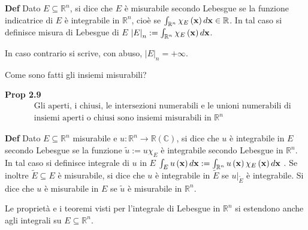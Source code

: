 \documentclass{article}
\begin{document}
\textbf{Def} Dato $E\subseteq 
\mathbb{R}
^{n}$, si dice che $E$ \`{e} misurabile secondo Lebesgue se la funzione
indicatrice di $E$ \`{e} integrabile in $%
\mathbb{R}
^{n}$, cio\`{e} se $\int_{%
\mathbb{R}
^{n}}\chi _{E}\left( \mathbf{x}\right) d\mathbf{x}\in 
\mathbb{R}
$. In tal caso si definisce misura di Lebesgue di $E$ $\left\vert
E\right\vert _{n}:=\int_{%
\mathbb{R}
^{n}}\chi _{E}\left( \mathbf{x}\right) d\mathbf{x}$.

In caso contrario si scrive, con abuso, $\left\vert E\right\vert
_{n}=+\infty $.

Come sono fatti gli insiemi misurabili?

\textbf{Prop 2.9 } 
\begin{eqnarray*}
&&\text{Gli aperti, i chiusi, le intersezioni numerabili e le unioni
numerabili di} \\
&&\text{insiemi aperti o chiusi sono insiemi misurabili in }%
\mathbb{R}
^{n}
\end{eqnarray*}

\textbf{Def} Dato $E\subseteq 
\mathbb{R}
^{n}$ misurabile e $u:%
\mathbb{R}
^{n}\rightarrow 
\mathbb{R}
\left( 
\mathbb{C}
\right) $, si dice che $u$ \`{e} integrabile in $E$ secondo Lebesgue se la
funzione $\tilde{u}:=u\chi _{E}$ \`{e} integrabile secondo Lebesgue in $%
\mathbb{R}
^{n}$. In tal caso si definisce integrale di $u$ in $E$ $\int_{E}u\left( 
\mathbf{x}\right) d\mathbf{x}:=\int_{%
\mathbb{R}
^{n}}u\left( \mathbf{x}\right) \chi _{E}\left( \mathbf{x}\right) d\mathbf{x}$%
. Se inoltre $\tilde{E}\subseteq E$ \`{e} misurabile, si dice che $u$ \`{e}
integrabile in $\tilde{E}$ se $u|_{\tilde{E}}$ \`{e} integrabile. Si dice
che $u$ \`{e} misurabile in $E$ se $\tilde{u}$ \`{e} misurabile in $%
\mathbb{R}
^{n}$.

Le propriet\`{a} e i teoremi visti per l'integrale di Lebesgue in $%
\mathbb{R}
^{n}$ si estendono anche agli integrali su $E\subseteq 
\mathbb{R}
^{n}$.
\end{document}
